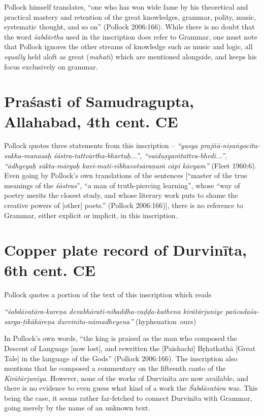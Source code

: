 Pollock himself translates, ``one who has won wide fame by his theoretical and practical mastery and retention of the great knowledges, grammar, polity, music, systematic thought, and so on'' (Pollock 2006:166). While there is no doubt that the word {\sl śabdārtha} used in the inscription does refer to Grammar, one must note that Pollock ignores the other streams of knowledge such as music and logic, all {\sl equally} held aloft as great ({\sl mahatī}) which are mentioned alongside, and keeps his focus exclusively on grammar. 

\section{Praśasti of Samudragupta, Allahabad, 4th cent. CE}\label{chap3-sec2}

Pollock quotes three statements from this inscription -- {\sl ``yasya prajñā-niṣaṅgocita-sukha-manasaḥ śāstra-tattvārtha-bhartuḥ...'', ``vaiduṣyaṁ\break tattva-bhedi...'', ``ādhyeyaḥ sūkta-mārgaḥ kavi-mati-vibhavotsāraṇaṁ cāpi kāvyam''} (Fleet 1960:6). Even going by Pollock's own translations of the sentences [``master of the true meanings of the {\sl śāstras}'', ``a man of truth-piercing learning'', whose ``way of poetry merits the closest study, and whose literary work puts to shame the creative powers of [other] poets.'' (Pollock 2006:166)], there is no reference to Grammar, either explicit or implicit, in this inscription.

\section{Copper plate record of Durvinīta, 6th cent. CE}\label{chap3-sec3}

Pollock quotes a portion of the text of this inscription which reads 
\begin{myquote}
{{\sl ``śabdāvatāra-kareṇa devabhāratī-nibaddha-vaḍḍa-kathena kirātārjunīye pañca\-daśa-sarga-ṭīkākāreṇa durvinīta-nāmadheyena''}} 
\hfill \hbox{(hyphenation ours)}
\end{myquote}

In Pollock's own words, ``the king is praised as the man who composed the Descent of Language [now lost], and rewritten the [Paishachi] Bṛhatkathā [Great Tale] in the language of the Gods'' (Pollock 2006:166). The inscription also mentions that he composed a commentary on the fifteenth canto of the {\sl Kirātārjunīya}. However, none of the works of Durvinīta are now available, and there is no evidence to even guess what kind of a work the {\sl Śabdāvatāra} was. This being the case, it seems rather far-fetched to connect Durvinīta with Grammar, going merely by the name of an unknown text. 

